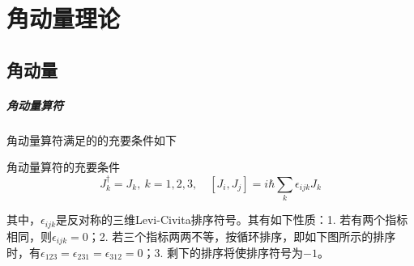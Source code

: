 \chapter{角动量理论}

\section{角动量}
\paragraph*{角动量算符} 角动量算符满足的的充要条件如下
\begin{theorem}{角动量算符的充要条件}
	\begin{equation}
		J^{\dagger}_k = J_k, ~ k = 1, 2, 3, \quad \left[J_i, J_j\right] = i\hbar \sum_{k} \epsilon_{ijk} J_k
	\end{equation}
\end{theorem}
其中，$\epsilon_{ijk}$是反对称的三维Levi-Civita排序符号。其有如下性质：1. 若有两个指标相同，则$\epsilon_{ijk} = 0$；2. 若三个指标两两不等，按循环排序，即如下图所示的排序时，有$\epsilon_{123} = \epsilon_{231} = \epsilon_{312} = 0$；3. 剩下的排序将使排序符号为$-1$。
\begin{figure}[htbp]
	\centering
\end{figure}

